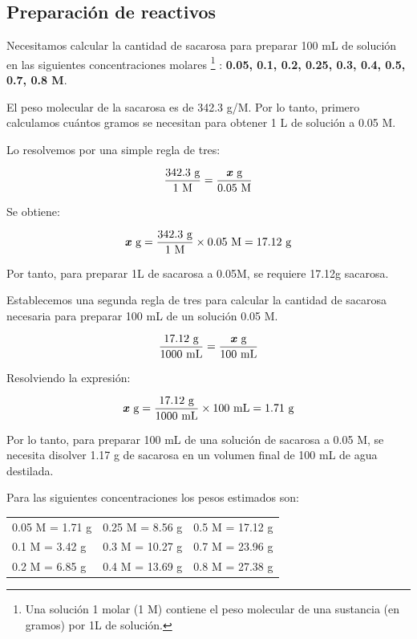 \subsection{Preparaci\'on de reactivos}

Necesitamos calcular la cantidad de sacarosa para preparar 100 mL de soluci\'on en las siguientes concentraciones molares \footnote{\footnotesize Una soluci\'on 1 molar (1 M) contiene el peso molecular de una sustancia (en gramos) por 1L de soluci\'on.} : \textbf{0.05, 0.1, 0.2, 0.25, 0.3, 0.4, 0.5, 0.7, 0.8 M}.

El peso molecular de la sacarosa es de 342.3 g/M. Por lo tanto, primero calculamos cu\'antos gramos se necesitan para obtener 1 L de soluci\'on a 0.05 M. 

\newpage

Lo resolvemos por una simple regla de tres:

$$\frac{342.3 \text{ g}}{1 \text{ M}} = \frac{\text{\textbf{\textit{x}}} \text{ g}}{0.05 \text{ M}}$$

Se obtiene:

$$ \text{\textbf{\textit{x}}} \text{ g} = \frac{342.3 \text{ g}}{1 \text{ M}} \times 0.05 \text{ M} = 17.12 \text{ g} $$

Por tanto, para preparar 1L de sacarosa a 0.05M, se requiere 17.12g sacarosa.

Establecemos una segunda regla de tres para calcular la cantidad de sacarosa necesaria para preparar 100 mL de un soluci\'on 0.05 M. 

$$\frac{17.12 \text{ g}}{1000 \text{ mL}} = \frac{\text{\textbf{\textit{x}}} \text{ g}}{100 \text{ mL}}$$

Resolviendo la expresi\'on:

$$ \text{\textbf{\textit{x}}} \text{ g} = \frac{17.12 \text{ g}}{1000 \text{ mL}} \times 100 \text{ mL} = 1.71 \text{ g} $$

Por lo tanto, para preparar 100 mL de una soluci\'on de sacarosa a 0.05 M, se necesita disolver 1.17 g de sacarosa en un volumen final de 100 mL de agua destilada.

Para las siguientes concentraciones los pesos estimados son:

\begin{tabular}{p{}p{}p{}}
 0.05 M = 1.71 g  &  0.25 M = 8.56 g & 0.5 M = 17.12 g \\
0.1 M = 3.42 g & 0.3 M = 10.27 g & 0.7 M = 23.96 g \\
 0.2 M = 6.85 g & 0.4 M = 13.69 g & 0.8 M = 27.38 g
\end{tabular}

